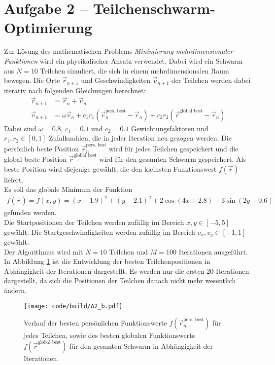 \section{Aufgabe 2 –  Teilchenschwarm-Optimierung}
\label{sec:A2}

Zur Lösung des mathematischen Problems \textit{Minimierung mehrdimensionaler Funktionen} wird ein physikalischer Ansatz verwendet.
Dabei wird ein Schwarm aus $N=10$ Teilchen simuliert, die sich in einem mehrdimensionalen Raum bewegen.
Die Orte $\vec{r}_{n+1}$ und Geschwindigkeiten $\vec{v}_{n+1}$ der Teilchen werden dabei iterativ nach folgenden Gleichungen berechnet:
\begin{align}
    \vec{r}_{n+1} &= \vec{r}_n + \vec{v}_{n} \\
    \vec{v}_{n+1} &= \omega \vec{v}_n + c_1 r_1 (\vec{r}_n^\text{pers. best} - \vec{r}_n) + c_2 r_2 (\vec{r}^\text{global best} - \vec{r}_n)
\end{align}
Dabei sind $\omega=0.8$, $c_1=0.1$ und $c_2=0.1$ Gewichtungsfaktoren und $r_1, r_2 \in [0,1]$ Zufallszahlen, die in jeder Iteration neu gezogen werden.
Die persönlich beste Position $\vec{r}_n^\text{pers. best}$ wird für jedes Teilchen gespeichert und die global beste Position $\vec{r}^\text{global best}$ wird für den gesamten Schwarm gespeichert.
Als beste Position wird diejenige gewählt, die den kleinsten Funktionswert $f(\vec{r})$ liefert.
\\
Es soll das globale Minimum der Funktion
\begin{align}
   f(\vec{r}) = f (x, y) = (x - 1.9)^2 + (y - 2.1)^2 + 2 \cos(4x + 2.8) + 3 \sin(2y + 0.6)
\end{align}
gefunden werden.
\\
Die Startpositionen der Teilchen werden zufällig im Bereich $x, y \in [-5, 5]$ gewählt.
Die Startgeschwindigkeiten werden zufällig im Bereich $v_x, v_y \in [-1, 1]$ gewählt.
\\
Der Algorithmus wird mit $N=10$ Teilchen und $M=100$ Iterationen ausgeführt.
\\
In Abbildung \ref{fig:A2_b} ist die Entwicklung der besten Teilchenpositionen in Abhängigkeit der Iterationen dargestellt.
Es werden nur die ersten 20 Iterationen dargestellt, da sich die Positionen der Teilchen danach nicht mehr wesentlich ändern.
\begin{figure}
    \centering
    \texttt{[image: code/build/A2\_b.pdf]}
    \caption{Verlauf der besten persönlichen Funktionswerte $f(\vec{r}_n^\text{pers. best})$ für jedes Teilchen, sowie des besten globalen Funktionswerts $f(\vec{r}^\text{global best})$ für den gesamten Schwarm in Abhängigkeit der Iterationen.}
    \label{fig:A2_b}
\end{figure}
